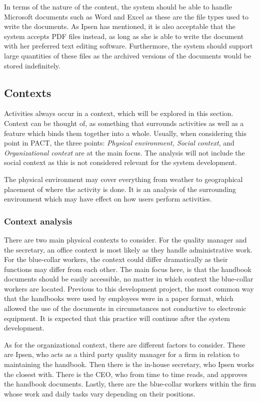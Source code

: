 In terms of the nature of the content, the system should be able to handle Microsoft documents such as Word and Excel as these are the file types used to write the documents.
As Ipsen has mentioned, it is also acceptable that the system accepts PDF files instead, as long as she is able to write the document with her preferred text editing software.
Furthermore, the system should support large quantities of these files as the archived versions of the documents would be stored indefinitely.

\subsection{Contexts}\label{sec:pactcontext}
Activities always occur in a context, which will be explored in this section.
Context can be thought of, as something that surrounds activities as well as a feature which binds them together into a whole.
Usually, when considering this point in PACT, the three points: \textit{Physical environment, Social context}, and \textit{Organizational context} are at the main focus.
The analysis will not include the social context as this is not considered relevant for the system development.

The physical environment may cover everything from weather to geographical placement of where the activity is done.
It is an analysis of the surrounding environment which may have effect on how users perform activities.

\subsubsection*{Context analysis}
There are two main physical contexts to consider.
For the quality manager and the secretary, an office context is most likely as they handle administrative work.
For the blue-collar workers, the context could differ dramatically as their functions may differ from each other.
The main focus here, is that the handbook documents should be easily accessible, no matter in which context the blue-collar workers are located.
Previous to this development project, the most common way that the handbooks were used by employees were in a paper format, which allowed the use of the documents in circumstances not conductive to electronic equipment.
It is expected that this practice will continue after the system development.

As for the organizational context, there are different factors to consider.
These are Ipsen, who acts as a third party quality manager for a firm in relation to maintaining the handbook.
Then there is the in-house secretary, who Ipsen works the closest with.
There is the CEO, who from time to time reads, %
and approves the handbook documents.
Lastly, there are the blue-collar workers within the firm whose work and daily tasks vary depending on their positions.

